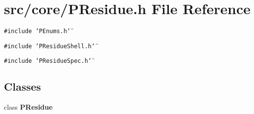 \section{src/core/PResidue.h File Reference}
\label{PResidue_8h}


{\tt \#include \char`\"{}PEnums.h\char`\"{}}\par
{\tt \#include \char`\"{}PResidue\-Shell.h\char`\"{}}\par
{\tt \#include \char`\"{}PResidue\-Spec.h\char`\"{}}\par
\subsection*{Classes}
\begin{CompactItemize}
\item 
class {\bf PResidue}
\end{CompactItemize}
